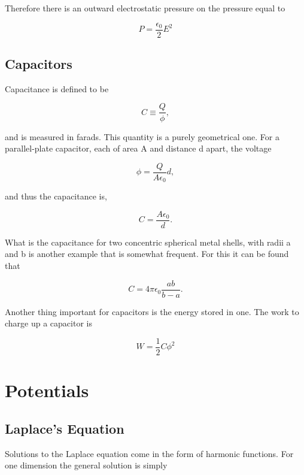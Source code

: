 \documentclass[preprint, review,12pt]{elsarticle}
\begin{document}
Therefore there is an outward electrostatic pressure on the pressure equal to

\begin{equation}
    P = \frac{\epsilon_0}{2}E^2
\end{equation}

\subsection{Capacitors}

Capacitance is defined to be

\begin{equation}
    C \equiv \frac{Q}{\phi},
\end{equation}

and is measured in farads. This quantity is a purely geometrical one. For a parallel-plate capacitor, each of area A and distance d apart, the voltage

\begin{equation}
    \phi = \frac{Q}{A\epsilon_0}d,
\end{equation}

and thus the capacitance is,

\begin{equation}
    C = \frac{A\epsilon_0}{d}.
\end{equation}

What is the capacitance for two concentric spherical metal shells, with radii a and b is another example that is somewhat frequent. For this it can be found that

\begin{equation}
    C = 4\pi \epsilon_0 \frac{ab}{b-a}.
\end{equation}

Another thing important for capacitors is the energy stored in one. The work to charge up a capacitor is

\begin{equation}
    W = \frac{1}{2}C \phi^2
\end{equation}


\section{Potentials}

\subsection{Laplace's Equation}

Solutions to the Laplace equation come in the form of harmonic functions. For one dimension the general solution is simply
\end{document}
